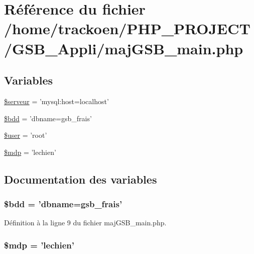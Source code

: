 \hypertarget{maj_g_s_b__main_8php}{\section{Référence du fichier /home/trackoen/\-P\-H\-P\-\_\-\-P\-R\-O\-J\-E\-C\-T/\-G\-S\-B\-\_\-\-Appli/maj\-G\-S\-B\-\_\-main.php}
\label{maj_g_s_b__main_8php}
}
\subsection*{Variables}
\begin{DoxyCompactItemize}
\item 
\hyperlink{maj_g_s_b__main_8php_a4ffb9d7258acf24e1ff550bceba60ed2}{\$serveur} = 'mysql\-:host=localhost'
\item 
\hyperlink{maj_g_s_b__main_8php_a94f91e878bce0991e2cd595c5dd79b3f}{\$bdd} = 'dbname=gsb\-\_\-frais'
\item 
\hyperlink{maj_g_s_b__main_8php_a598ca4e71b15a1313ec95f0df1027ca5}{\$user} = 'root'
\item 
\hyperlink{maj_g_s_b__main_8php_a8a65334de2f0d486a42b02ecf82fe8fb}{\$mdp} = 'lechien'
\end{DoxyCompactItemize}


\subsection{Documentation des variables}
\hypertarget{maj_g_s_b__main_8php_a94f91e878bce0991e2cd595c5dd79b3f}{
\subsubsection[{\$bdd}]{\setlength{\rightskip}{0pt plus 5cm}\$bdd = 'dbname=gsb\-\_\-frais'}}\label{maj_g_s_b__main_8php_a94f91e878bce0991e2cd595c5dd79b3f}


Définition à la ligne 9 du fichier maj\-G\-S\-B\-\_\-main.\-php.

\hypertarget{maj_g_s_b__main_8php_a8a65334de2f0d486a42b02ecf82fe8fb}{
\subsubsection[{\$mdp}]{\setlength{\rightskip}{0pt plus 5cm}\$mdp = 'lechien'}}\label{maj_g_s_b__main_8php_a8a65334de2f0d486a42b02ecf82fe8fb}


